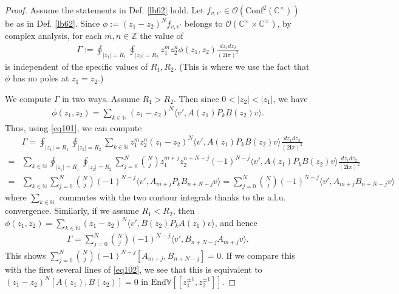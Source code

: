 \documentclass[12pt,a4paper,notitlepage]{article}
\theoremstyle{definition}
\theoremstyle{plain}
\newcommand{\End}{\mathrm{End}} %
\newcommand{\Conf}{\mathrm{Conf}}
\newcommand{\bk}[1]{\langle {#1}\rangle}
\newcommand{\scr}{\mathscr}
\newcommand{\im}{\mathbf{i}}
\newcommand{\Vbb}{\mathbb V}
\newcommand{\Cbb}{\mathbb C}
\newcommand{\Nbb}{\mathbb N}
\newcommand{\Zbb}{\mathbb Z}
\numberwithin{equation}{section}
\begin{document}
\begin{proof}
Assume the statements in Def. \ref{lb62} hold. Let $f_{v,v'}\in\scr O(\Conf^2(\Cbb^\times))$ be as in Def. \ref{lb62}. Since $\phi:=(z_1-z_2)^Nf_{v,v'}$ belongs to $\scr O(\Cbb^\times\times\Cbb^\times)$, by complex analysis, for each $m,n\in\Zbb$ the value of
\begin{align*}
\Gamma:=\oint_{|z_1|=R_1}\oint_{|z_2|=R_2}z_1^mz_2^n \phi(z_1,z_2)	\frac{dz_1dz_2}{(2\im\pi)^2}
\end{align*}
is independent of the specific values of $R_1,R_2$. (This is where we use the fact that $\phi$ has no poles at $z_1=z_2$.)

We compute $\Gamma$ in two ways. Assume $R_1>R_2$. Then since $0<|z_2|<|z_1|$, we have
\begin{align*}
\phi(z_1,z_2)=\sum_{k\in\Nbb}(z_1-z_2)^N\bk{v',A(z_1)P_kB(z_2)v}.	
\end{align*}
Thus, using \eqref{eq101}, we can compute
\begin{align*}
&\Gamma=	\oint_{|z_1|=R_1}\oint_{|z_2|=R_2}\sum_{k\in\Nbb} z_1^mz_2^n (z_1-z_2)^N\bk{v',A(z_1)P_kB(z_2)v}	\frac{dz_1dz_2}{(2\im\pi)^2}\\
=&\sum_{k\in\Nbb} \oint_{|z_1|=R_1}\oint_{|z_2|=R_2}\sum_{j=0}^N {N\choose j}z_1^{m+j}z_2^{n+N-j} (-1)^{N-j}\bk{v',A(z_1)P_kB(z_2)v}	\frac{dz_1dz_2}{(2\im\pi)^2}\\
=&\sum_{k\in\Nbb}\sum_{j=0}^N{N\choose j}(-1)^{N-j}\bk{v',A_{m+j}P_kB_{n+N-j}v}=\sum_{j=0}^N{N\choose j}(-1)^{N-j}\bk{v',A_{m+j}B_{n+N-j}v}
\end{align*}
where $\sum_{k\in\Nbb}$ commutes with the two contour integrals thanks to the a.l.u. convergence. Similarly, if we assume $R_1<R_2$, then $\phi(z_1,z_2)=\sum_{k\in\Nbb}(z_1-z_2)^N\bk{v',B(z_2)P_kA(z_1)v}$, and hence
\begin{align*}
	\Gamma=\sum_{j=0}^N{N\choose j}(-1)^{N-j}\bk{v',B_{n+N-j}A_{m+j}v}.
\end{align*}
This shows $\sum_{j=0}^N{N\choose j}(-1)^{N-j}[A_{m+j},B_{n+N-j}]=0$. If we compare this with the first several lines of \eqref{eq102}, we see that this is equivalent to $(z_1-z_2)^N[A(z_1),B(z_2)]=0$ in $\End\Vbb[[z_1^{\pm1},z_2^{\pm1}]]$. 
\end{proof}




\subsection{}\label{lb70}
\end{document}
